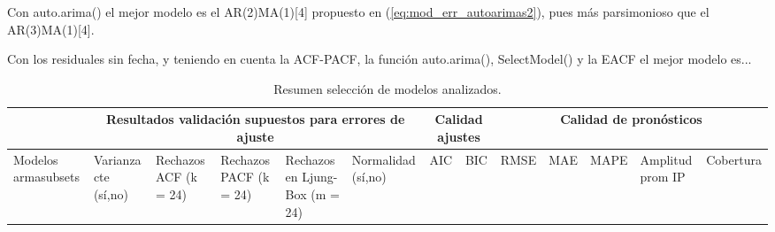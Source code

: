 \documentclass[11pt, letterpaper, twoside]{article}
\begin{document}
Con auto.arima() el mejor modelo es el AR(2)MA(1)[4] propuesto en (\ref{eq:mod_err_autoarimas2}), pues más parsimonioso que el AR(3)MA(1)[4].

Con los residuales sin fecha, y teniendo en cuenta la ACF-PACF, la función auto.arima(), SelectModel() y la EACF el mejor modelo es...

\begin{sidewaystable}
\caption{Resumen selección de modelos analizados.}
\label{tab:resumen_modelos}
\centering
{\footnotesize
\begin{tabular}{|p{1.8cm}|p{1.8cm}|p{1.8cm}|p{1.8cm}|p{1.7cm}|p{1.7cm}|p{0.9cm}|p{0.9cm}|p{0.8cm}|p{0.8cm}|p{0.9cm}|p{1.3cm}|c|}
\hline
 & \multicolumn{5}{c}{Resultados validación supuestos para errores de ajuste} & \multicolumn{2}{|c|}{Calidad ajustes} & \multicolumn{5}{c|}{Calidad de pronósticos} \\
 \hline
 Modelos \newline armasubsets & Varianza cte \newline (sí,no) & Rechazos \newline ACF \newline (k = 24) & Rechazos \newline PACF \newline (k = 24) & Rechazos en \newline Ljung-Box \newline (m = 24) & Normalidad \newline (sí,no) & AIC & BIC & RMSE & MAE & MAPE & Amplitud \newline prom IP & Cobertura \\


\end{tabular}}
\end{sidewaystable}
\end{document}

